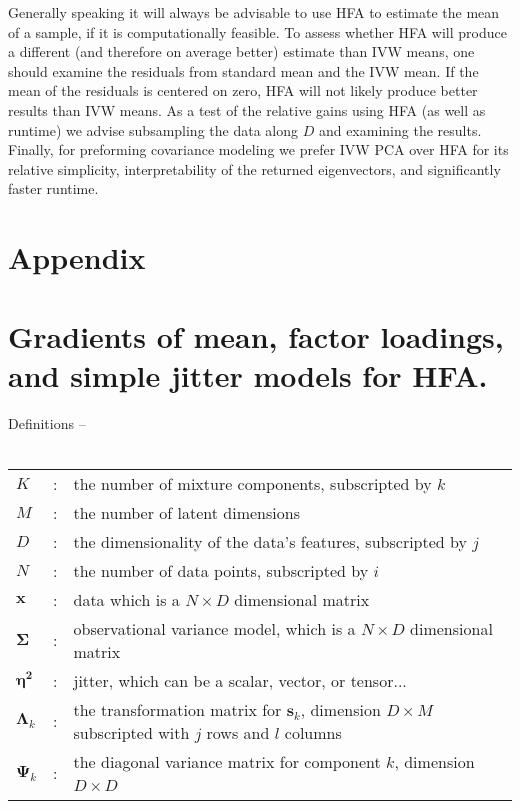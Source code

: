 \documentclass[12pt,preprint]{aastex}
\newcommand{\mbf}[1]{\boldsymbol{#1}}
\newcommand{\ps}{\mbf{\Psi}}
\newcommand{\sig}{\mbf{\Sigma}}
\begin{document}
Generally speaking it will always be advisable to use HFA to estimate the mean of a 
sample, if it is computationally feasible.  To assess whether HFA will produce a different 
(and therefore on average better) estimate than IVW means, one should examine the 
residuals from standard mean and the IVW mean.  If the mean of the residuals is centered 
on zero, HFA will not likely produce better results than IVW means.  As a test of the relative 
gains using HFA (as well as runtime) we advise subsampling the data along $D$ and 
examining the results.  Finally, for preforming covariance modeling we prefer IVW PCA 
over HFA for its relative simplicity, interpretability of the returned eigenvectors, and 
significantly faster runtime.


\section{Appendix}
\appendix
\section{Gradients of mean, factor loadings, and simple jitter models for HFA.}

\newcommand{\data}{\mbf{x}}
\newcommand{\latent}{\mbf{s}}
\newcommand{\mean}{\mbf{\mu}}
\newcommand{\cov}{\mbf{\Sigma}}
\newcommand{\eye}{\mbf{I}}
\newcommand{\bta}{\mbf{\beta}}
\newcommand{\lmda}{\mbf{\Lambda}}
\newcommand{\et}{\mbf{\eta^2}}


Definitions -- \\ \\
\begin{tabular}{lcl}
$K$ &:&the number of mixture components, subscripted by $k$\\
$M$&:& the number of latent dimensions\\
$D$&:& the dimensionality of the data's features, subscripted by $j$\\
$N$ &:&the number of data points, subscripted by $i$\\
$\data$ &:&data which is a $N \times D$ dimensional matrix\\ 
$\sig$ &:& observational variance model, which is a $N \times D$ dimensional matrix\\ 
$\et$ &:& jitter, which can be a scalar, vector, or tensor...\\ 
$\lmda_k$ &:&the transformation matrix for $\latent_k$, dimension
$D \times M$ subscripted with $j$ rows and $l$ columns\\
$\ps_k$ &:&the diagonal variance matrix for component $k$, dimension $D\times D$\
\end{tabular}
\end{document}
